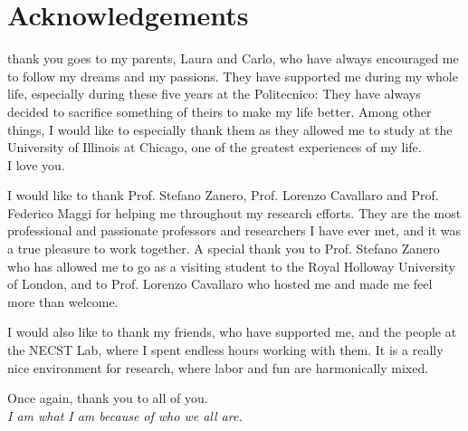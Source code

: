 \chapter*{Acknowledgements}

  thank you goes to my parents,
Laura and Carlo, who have always encouraged me to follow my
dreams and my passions. They have supported me during my whole life, especially during these five years at the Politecnico: They have always decided to sacrifice something of theirs to make my life better. Among other things, I would like to especially thank them
as they allowed me to study at the
University of Illinois at Chicago, one of the greatest
experiences of my life.\\
I love you.

\vspace{1cm}

I would like to thank Prof. Stefano Zanero, Prof. Lorenzo Cavallaro and Prof.
Federico Maggi
for helping me throughout my research efforts. They are the most professional
and passionate professors and researchers I have ever met, and it was a true pleasure
to work together. A special thank you to Prof. Stefano Zanero who has allowed me
to go as a visiting student to the Royal Holloway University of London, and to
Prof. Lorenzo Cavallaro who hosted me and made me feel more than welcome.

\vspace{1cm}

I would also like to thank my friends, who have supported me, and the people at the
NECST Lab, where I spent endless hours working with them. It is a really nice
environment for research, where labor and fun are harmonically mixed.

\vspace{1cm}

\begin{flushright}
Once again, thank you to all of you.\\
\emph{I am what I am because of who we all are.}
\end{flushright}
